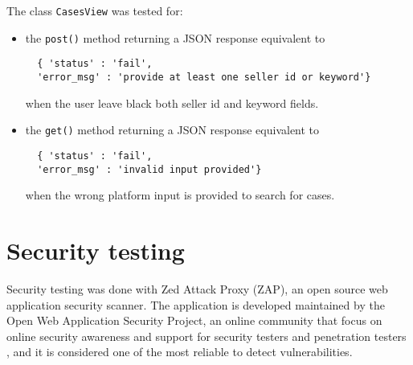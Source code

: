 The class \texttt{CasesView} was tested for:
\begin{itemize}
  \item the \texttt{post()} method returning a JSON response equivalent to
  \begin{verbatim}
  { 'status' : 'fail',
  'error_msg' : 'provide at least one seller id or keyword'} \end{verbatim} when
  the user leave black both seller id and keyword fields.
  \item the \texttt{get()} method returning a JSON response equivalent to
  \begin{verbatim}
  { 'status' : 'fail',
  'error_msg' : 'invalid input provided'} \end{verbatim} when the wrong platform
  input is provided to search for cases.
\end{itemize}


\section{Security testing}
Security testing was done with Zed Attack Proxy (ZAP), an open source web
application security scanner. The application is developed maintained by the
Open Web Application Security Project, an online community that focus on online
security awareness and support for security testers and penetration testers
\cite{zap}, and it is considered one of the most reliable to detect
vulnerabilities.


